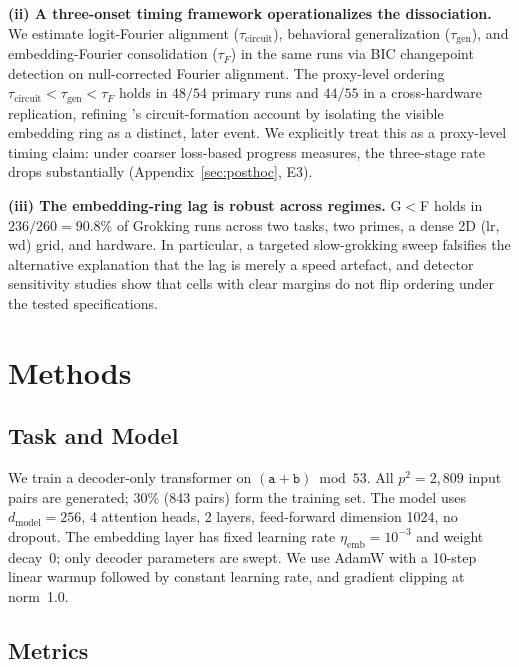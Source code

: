 \documentclass{article}
\newcommand{\taug}{\tau_{\mathrm{gen}}}
\newcommand{\tauf}{\tau_{F}}
\newcommand{\taucirc}{\tau_{\mathrm{circuit}}}
\begin{document}
\textbf{(ii) A three-onset timing framework operationalizes the
dissociation.} We estimate logit-Fourier alignment ($\taucirc$),
behavioral generalization ($\taug$), and embedding-Fourier
consolidation ($\tauf$) in the same runs via BIC changepoint
detection on null-corrected Fourier alignment. The proxy-level
ordering $\taucirc<\taug<\tauf$ holds in $48/54$ primary runs and
$44/55$ in a cross-hardware replication, refining
\citet{nanda2023progress}'s circuit-formation account by isolating
the visible embedding ring as a distinct, later event. We explicitly
treat this as a proxy-level timing claim: under coarser loss-based
progress measures, the three-stage rate drops substantially
(Appendix~\ref{sec:posthoc}, E3).

\textbf{(iii) The embedding-ring lag is robust across regimes.}
G$<$F holds in $236/260{=}90.8\%$ of Grokking runs across two
tasks, two primes, a dense 2D (lr, wd) grid, and hardware. In
particular, a targeted slow-grokking sweep falsifies the alternative
explanation that the lag is merely a speed artefact, and detector
sensitivity studies show that cells with clear margins do not flip
ordering under the tested specifications.

\section{Methods}
\label{sec:methods}

\subsection{Task and Model}

We train a decoder-only transformer \citep{vaswani2017attention} on
$(\mathtt{a}+\mathtt{b})\bmod 53$.
All $p^2=2{,}809$ input pairs are generated; 30\% (843 pairs) form
the training set.
The model uses $d_{\mathrm{model}}=256$, 4 attention heads, 2 layers,
feed-forward dimension 1024, no dropout.
The embedding layer has fixed learning rate $\eta_{\mathrm{emb}}
=10^{-3}$ and weight decay~0; only decoder parameters are swept.
We use AdamW \citep{loshchilov2019decoupled} with a 10-step linear
warmup followed by constant learning rate, and gradient clipping at norm~1.0.

\subsection{Metrics}
\end{document}

